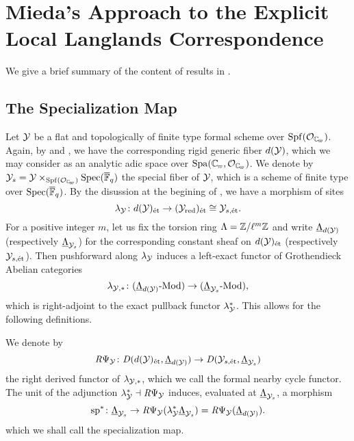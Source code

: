 \documentclass[../main.tex]{subfiles}
\begin{document}
\section{Mieda's Approach to the Explicit Local Langlands Correspondence} %
\label{sec:Mieda's Approach to the Explicit Local Langlands Correspondence}

We give a brief summary of the content of results in \cite{mieda2016geometric}.

\subsection{The Specialization Map} %
\label{sub:The Injectivity FinLevel}
Let $\mathcal{Y}$ be a flat and topologically of finite type formal scheme over $\Spf(\cO_\Cp)$.
Again, by \cite{raynaud1974geometrie} and \cite[§1.9]{huber2013etale},
we 
have the corresponding rigid generic fiber $d(\mathcal{Y})$, which we may
consider as an analytic adic space over $\Spa(\Cp,\cO_\Cp)$. We denote by $\cY_s = \cY \times_{\Spf(\cO_\Cp)} \spec
(\Fqbar)$ the special fiber of $\mathcal{Y}$, which is a scheme of finite type over $\operatorname{Spec}(
{\overline {\mathbb{F}}_q})$. By the disussion at the begining of \cite[§
3.5]{huber2013etale}, we have a morphism of sites
\begin{equation*}
  \lambda_{\mathcal{Y}} \colon d(\mathcal{Y})_{\textnormal{\'et}} \to (\mathcal{Y}_{\mathrm{red}})_{\textnormal{\'et}} \cong \mathcal{Y}_{s, \textnormal{\'et}}.
\end{equation*}
For a positive integer $m$, let us fix the torsion ring $\Lambda = \mathbb{Z}/\ell^m
\mathbb{Z}$ and write $\underline \Lambda_{d(\mathcal{Y})}$ (respectively $\underline
\Lambda_{\mathcal{Y}_{s}}$)
for the corresponding constant sheaf on $d(\mathcal{Y})_{\textnormal{\'et}}$ (respectively $\mathcal{Y}_{s,\textnormal{\'et}}$). Then 
pushforward along $\lambda_{\mathcal{Y}}$ induces a left-exact functor of Grothendieck
Abelian categories
\begin{equation*}
  \lambda_{\mathcal{Y},*}\colon {({\underline \Lambda_{d(\mathcal{Y})}}\textnormal-\allowbreak\mathrm{Mod})} \to {({\underline \Lambda_{\mathcal{Y}_{s}}}\textnormal-\allowbreak\mathrm{Mod})},
\end{equation*}
which is right-adjoint to the exact pullback functor $\lambda_{\mathcal{Y}}^*$.
This allows for the following definitions.

\begin{defi}\label{def:FormalNearbyCycleFunctor}
  We denote by
  \begin{equation*}
    \mathit R \Psi_{\mathcal{Y}}\colon \mathit D (d(\mathcal{Y})_{\textnormal{\'et}}, {\underline \Lambda_{d(\mathcal{Y})}}) \to
    \mathit D (\mathcal{Y}_{s, \textnormal{\'et}},{\underline \Lambda_{\mathcal{Y}_{s}}})
  \end{equation*}
  the right derived functor of $\lambda_{\mathcal{Y},*}$, which we call the formal nearby
  cycle functor. The unit of the adjunction $\lambda_{\mathcal{Y}}^* \dashv 
  \mathit R \Psi_{\mathcal{Y}}$ induces, evaluated at $\underline \Lambda_{\mathcal{Y}_{s}}$, a morphism
  \begin{equation*}
    \mathrm{sp}^* \colon \underline \Lambda_{\mathcal{Y}_{s}} \to 
    \mathit R \Psi_{\mathcal{Y}}( \lambda_{\mathcal{Y}}^* \underline \Lambda_{\mathcal{Y}_{s}}) = 
    \mathit R \Psi_{\mathcal{Y}}(\underline \Lambda_{d(\mathcal{Y})}).
  \end{equation*}
  which we shall call the specialization map.
\end{defi}
\end{document}
